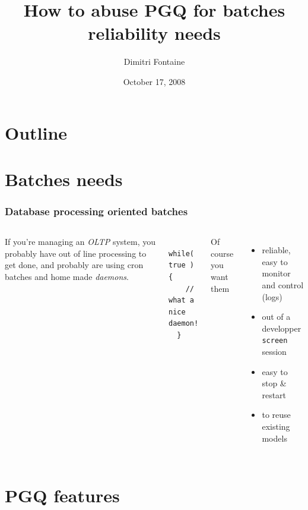 \documentclass{beamer}
\title{How to abuse PGQ for batches reliability needs}
\author{Dimitri Fontaine}
\date{October 17, 2008}
\begin{document}
\frame{\titlepage}

\section*{Outline}

\section{Batches needs}

\begin{frame}[fragile]
  \frametitle{Database processing oriented batches}

\begin{columns}[c]


If you're managing an \textit{OLTP} system, you probably have out of line
processing to get done, and probably are using cron batches and home made
\textit{daemons}.

\pause
\begin{example}
\begin{verbatim}
  while( true ) {
    // what a nice daemon!
  }
\end{verbatim}
\end{example}

\pause
{} 
  Of course you want them 
  \begin{itemize}
   \item<3-> reliable, easy to monitor and control (logs)
   \item<4-> out of a developper \texttt{screen} session
   \item<5-> easy to stop \& restart
   \item<6-> to reuse existing models
  \end{itemize}

\end{columns}
\end{frame}

\section{PGQ features}

\end{document}
